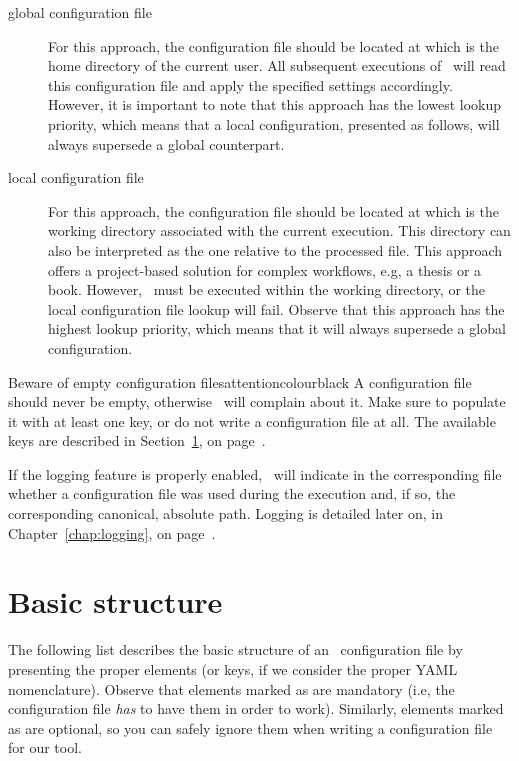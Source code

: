 \begin{description}
\item[global configuration file] For this approach, the configuration file should be located at  which is the home directory of the current user. All subsequent executions of \arara\ will read this configuration file and apply the specified settings accordingly. However, it is important to note that this approach has the lowest lookup priority, which means that a local configuration, presented as follows, will always supersede a global counterpart.

\item[local configuration file] For this approach, the configuration file should be located at  which is the working directory associated with the current execution. This directory can also be interpreted as the one relative to the processed file. This approach offers a project-based solution for complex workflows, e.g, a thesis or a book. However, \arara\ must be executed within the working directory, or the local configuration file lookup will fail. Observe that this approach has the highest lookup priority, which means that it will always supersede a global configuration.
\end{description}

\begin{messagebox}{Beware of empty configuration files}{attentioncolour}{\icattention}{black}
A configuration file should never be empty, otherwise \arara\ will complain about it. Make sure to populate it with at least one key, or do not write a configuration file at all. The available keys are described in Section~\ref{sec:basicstructure}, on page~\pageref{sec:basicstructure}.
\end{messagebox}

If the logging feature is properly enabled, \arara\ will indicate in the corresponding  file whether a configuration file was used during the execution and, if so, the corresponding canonical, absolute path. Logging is detailed later on, in Chapter~\ref{chap:logging}, on page~\pageref{chap:logging}.

\section{Basic structure}
\label{sec:basicstructure}

The following list describes the basic structure of an \arara\ configuration file by presenting the proper elements (or keys, if we consider the proper \gls{YAML} nomenclature). Observe that elements marked as  are mandatory (i.e, the configuration file \emph{has} to have them in order to work). Similarly, elements marked as  are optional, so you can safely ignore them when writing a configuration file for our tool.

